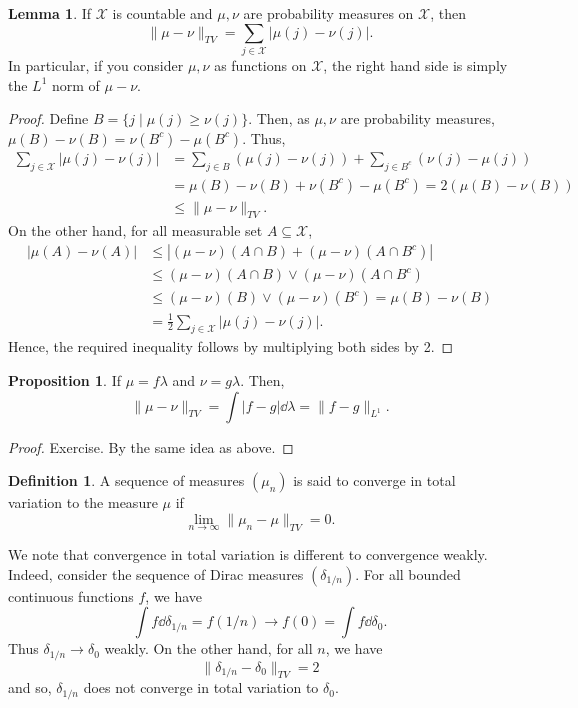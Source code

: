 \documentclass[]{article}
\theoremstyle{definition}
\theoremstyle{definition}
\newtheorem{definition}{Definition}[section]
\newtheorem{lemma}{Lemma}[section]
\newtheorem{proposition}{Proposition}[section]
\begin{document}
\begin{lemma}
  If \(\mathcal{X}\) is countable and \(\mu, \nu\) are probability measures on 
  \(\mathcal{X}\), then 
  \[\|\mu - \nu\|_{TV} = \sum_{j \in \mathcal{X}} |\mu(j) - \nu(j)|.\]
  In particular, if you consider \(\mu, \nu\) as functions on \(\mathcal{X}\), 
  the right hand side is simply the \(L^1\) norm of \(\mu - \nu\).
\end{lemma}
\begin{proof}
  Define \(B = \{j \mid \mu(j) \ge \nu(j)\}\). Then, as \(\mu, \nu\) are probability 
  measures, \(\mu(B) - \nu(B) = \nu(B^c) - \mu(B^c)\). Thus, 
  \[\begin{split}
    \sum_{j \in \mathcal{X}} |\mu(j) - \nu(j)| & = 
    \sum_{j \in B} (\mu(j) - \nu(j)) + \sum_{j \in B^c} (\nu(j) - \mu(j))\\
    & = \mu(B) - \nu(B) + \nu(B^c) - \mu(B^c) = 2(\mu(B) - \nu(B))\\ 
    & \le \|\mu - \nu\|_{TV}.
  \end{split}\]
  On the other hand, for all measurable set \(A \subseteq \mathcal{X}\),
  \[\begin{split}
    |\mu(A) - \nu(A)| & \le
    |(\mu - \nu)(A \cap B) + (\mu - \nu)(A \cap B^c)|\\
    & \le (\mu - \nu)(A \cap B) \vee (\mu - \nu)(A \cap B^c)\\
    & \le (\mu - \nu)(B) \vee (\mu - \nu)(B^c) = \mu(B) - \nu(B)\\
    & = \frac{1}{2}\sum_{j \in \mathcal{X}} |\mu(j) - \nu(j)|.
  \end{split}\]
  Hence, the required inequality follows by multiplying both sides by 2.
\end{proof}

\begin{proposition}
  If \(\mu = f \lambda\) and \(\nu = g\lambda\). Then, 
  \[\|\mu - \nu\|_{TV} = \int |f - g| \dd \lambda = \|f - g\|_{L^1}.\]
\end{proposition}
\begin{proof}
  Exercise. By the same idea as above.
\end{proof}

\begin{definition}
  A sequence of measures \((\mu_n)\) is said to converge in total variation 
  to the measure \(\mu\) if 
  \[\lim_{n \to \infty}\|\mu_n - \mu\|_{TV} = 0.\]
\end{definition}

We note that convergence in total variation is different to convergence weakly. 
Indeed, consider the sequence of Dirac measures \((\delta_{1 / n})\). 
For all bounded continuous functions \(f\), we have 
\[\int f \dd \delta_{1 / n} = f(1 / n) \to f(0) = \int f \dd \delta_0.\]
Thus \(\delta_{1 / n} \to \delta_0\) weakly. On the other hand, 
for all \(n\), we have 
\[\|\delta_{1 / n} - \delta_0\|_{TV} = 2\]
and so, \(\delta_{1 / n}\) does not converge in total variation to \(\delta_0\).
\end{document}

